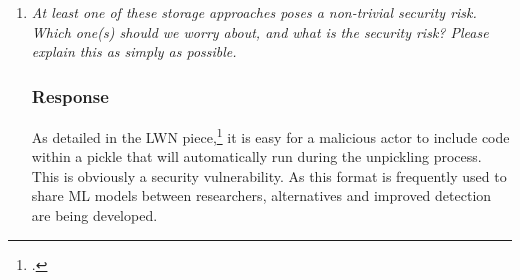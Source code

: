 \documentclass{article}
\newcommand{\response}{\subsubsection*{Response}}
\begin{document}
\begin{enumerate}
\begin{enumerate}
        \item[] \texttt{Elasticsearch}\footcite{elastic-graph}
        \begin{enumerate}
            \item Requires a database backend, overkill for small graphs.
            \item Not designed for many traditional graph algorithms or analyses, so data needs to be imported to NetworkX or similar for dedicated analysis. 
            \item Potentially steeper learning curve? At least it would be for me. 
            \item Some potential security risk, see Q1.c
        \end{enumerate}
    \end{enumerate}
    \item \textit{At least one of these storage approaches poses a non-trivial security risk. Which one(s) should we worry about, and what is the security risk? Please explain this as simply as possible.}
    \response
    As detailed in the LWN piece,\footcite{alden-pickles} it is easy for a malicious actor to include code within a pickle that will automatically run during the unpickling process. This is obviously a security vulnerability. As this format is frequently used to share ML models between researchers, alternatives and improved detection are being developed. 


\end{enumerate}
\end{document}
